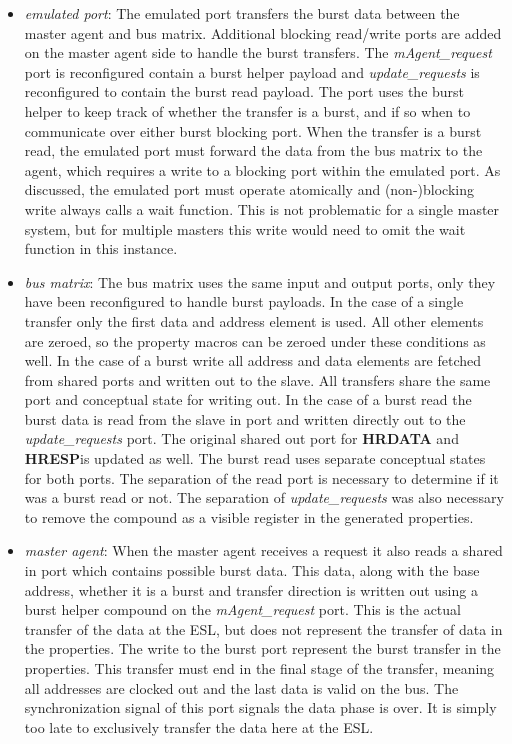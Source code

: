 \begin{itemize}
 \item \textit{emulated port}: The emulated port transfers the burst data between the master agent and bus matrix. Additional blocking read/write ports are added on the master agent side to handle the burst transfers. The \textit{mAgent\_request} port is reconfigured contain a burst helper payload and \textit{update\_requests} is reconfigured to contain the burst read payload. The port uses the burst helper to keep track of whether the transfer is a burst, and if so when to communicate over either burst blocking port. When the transfer is a burst read, the emulated port must forward the data from the bus matrix to the agent, which requires a write to a blocking port within the emulated port. As discussed, the emulated port must operate atomically and (non-)blocking write always calls a wait function. This is not problematic for a single master system, but for multiple masters this write would need to omit the wait function in this instance.       
 \item \textit{bus matrix}: The bus matrix uses the same input and output ports, only they have been reconfigured to handle burst payloads. In the case of a single transfer only the first data and address element is used. All other elements are zeroed, so the property macros can be zeroed under these conditions as well. In the case of a burst write all address and data elements are fetched from shared ports and written out to the slave. All transfers share the same port and conceptual state for writing out. In the case of a burst read the burst data is read from the slave in port and written directly out to the \textit{update\_requests} port. The original shared out port for \textbf{HRDATA} and \textbf{HRESP}is updated as well. The burst read uses separate conceptual states for both ports. The separation of the read port is necessary to determine if it was a burst read or not. The separation of \textit{update\_requests} was also necessary to remove the compound as a visible register in the generated properties. 
 \item \textit{master agent}: When the master agent receives a request it also reads a shared in port which contains possible burst data. This data, along with
the base address, whether it is a burst and transfer direction is written out using a burst helper compound on the \textit{mAgent\_request} port. This is the actual transfer of the data at the ESL, but does not represent the transfer of data in the properties. The write to the burst port represent the burst transfer in the properties. This transfer must end in the final stage of the transfer, meaning all addresses are clocked out and the last data is valid on the bus. The synchronization signal of this port signals the data phase is over. It is simply too late to exclusively transfer the data here at the ESL.   
\end{itemize}     

